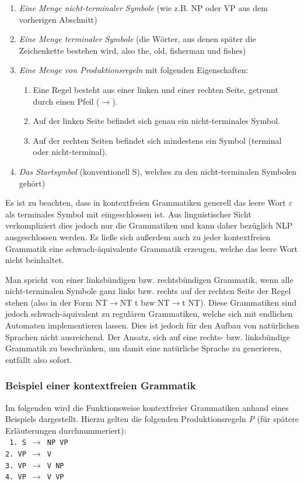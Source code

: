 \documentclass[12pt]{report}
\begin{document}
\begin{enumerate}
\item \textit{Eine Menge nicht-terminaler Symbole} (wie z.B. NP oder VP aus dem vorherigen Abschnitt)
\item \textit{Eine Menge terminaler Symbole} (die Wörter, aus denen später die Zeichenkette bestehen wird, also \glqq  the\grqq{}, \glqq  old\grqq{}, \glqq  fisherman\grqq{} und \glqq  fishes\grqq{})
\item \textit{Eine Menge von \glqq Produktionsregeln \grqq{}} mit folgenden Eigenschaften:
\begin{enumerate}
\item Eine Regel besteht aus einer linken und einer rechten Seite, getrennt durch einen Pfeil ($\rightarrow$).
\item Auf der linken Seite befindet sich genau ein nicht-terminales Symbol.
\item Auf der rechten Seiten befindet sich mindestens ein Symbol (terminal oder nicht-terminal).
\end{enumerate}
\item \textit{Das Startsymbol} (konventionell \glqq  S\grqq{}), welches zu den nicht-terminalen Symbolen gehört)
\end{enumerate}

Es ist zu beachten, dass in kontextfreien Grammatiken generell das leere Wort $\varepsilon$ als terminales Symbol mit eingeschlossen ist. Aus linguistischer Sicht verkompliziert dies jedoch nur die Grammatiken und kann daher bezüglich NLP ausgeschlossen werden. Es ließe sich außerdem auch zu jeder kontextfreien Grammatik eine schwach-äquivalente Grammatik erzeugen, welche das leere Wort nicht beinhaltet.

Man spricht von einer linksbündigen bzw. rechtsbündigen Grammatik, wenn alle nicht-terminalen Symbole ganz links bzw. rechts auf der rechten Seite der Regel stehen (also in der Form \glqq  NT$\rightarrow$NT t\grqq{} bzw \glqq  NT$\rightarrow$t NT\grqq{}). Diese Grammatiken sind jedoch schwach-äquivalent zu regulären Grammatiken, welche sich mit endlichen Automaten implementieren lassen. Dies ist jedoch für den Aufbau von natürlichen Sprachen nicht ausreichend. Der Ansatz, sich auf eine rechts- bzw. linksbündige Grammatik zu beschränken, um damit eine natürliche Sprache zu generieren, entfällt also sofort. 

\subsubsection{Beispiel einer kontextfreien Grammatik}
Im folgenden wird die Funktionsweise kontextfreier Grammatiken anhand eines Beispiels dargestellt. Hierzu gelten die folgenden Produktionsregeln \textit{P} (für spätere Erläuterungen durchnummeriert):
\newline
\\
\tt
1. S $\rightarrow$ NP VP\\
2. VP $\rightarrow$ V\\
3. VP $\rightarrow$ V NP\\
4. VP $\rightarrow$ V VP\\
\end{document}
